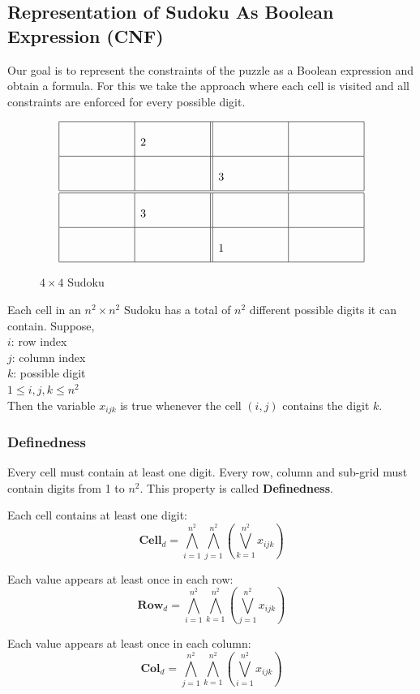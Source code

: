 \documentclass[12pt]{article}
\begin{document}
\subsection{Representation of Sudoku As Boolean Expression (CNF)}
Our goal is to represent the constraints of the puzzle as a Boolean expression and obtain a formula. For this we take the approach where each cell is visited and all constraints are enforced for every possible digit.


\begin{figure}[h]

\[
\renewcommand{\arraystretch}{2.5}
\begin{array}{|p{2cm}|p{2cm}||p{2cm}|p{2cm}|}
\hline
 & 2 &  &  \\
\hline
 &  & 3 &  \\
\hline\hline
 & 3  &  &  \\
\hline
 &  & 1 &  \\
\hline
\end{array}
\]
\caption{$4 \times 4$ Sudoku}
\label{fig:44}
\end{figure}


Each cell in an $n^2 \times n^2$ Sudoku has a total of $n^2$ different possible digits it can contain.
Suppose, \\
$i$:  row index  \\
$j$: column index \\ 
$k$: possible digit  \\  
$ 1 \leq i, j , k  \leq n^2$ \\ 
Then the variable $ x_{ijk} $ is true whenever the cell $(i,j)$ contains the digit $k$.


\subsubsection{Definedness}
Every cell must contain at least one digit. Every row, column and sub-grid must contain digits from 1 to $n^2$. This property is called \textbf{Definedness}.

Each cell contains at least one digit:
\[
\textbf{Cell$_d$} =
\bigwedge_{i=1}^{n^2}
\bigwedge_{j=1}^{n^2}
\left(
\bigvee_{k=1}^{n^2} x_{ijk}
\right)
\]


Each value appears at least once in each row:  
\[
\textbf{Row$_d$} =
\bigwedge_{i=1}^{n^2}
\bigwedge_{k=1}^{n^2}
\left(
\bigvee_{j=1}^{n^2} x_{ijk}
\right)
\]


Each value appears at least once in each column:  
\[
\textbf{Col$_d$} =
\bigwedge_{j=1}^{n^2}
\bigwedge_{k=1}^{n^2}
\left(
\bigvee_{i=1}^{n^2} x_{ijk}
\right)
\]
\end{document}
